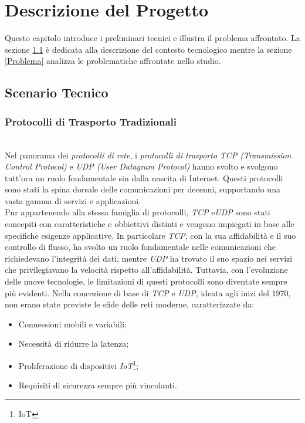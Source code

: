 \chapter{Descrizione del Progetto}
\label{cap:descrizione}

Questo capitolo introduce i preliminari tecnici e illustra il problema affrontato. La sezione \ref{Scenario} è dedicata alla descrizione del contesto tecnologico mentre la sezione \ref{Problema} analizza le problematiche affrontate nello studio. 

\section{Scenario Tecnico}
\label{Scenario}
\subsection{Protocolli di Trasporto Tradizionali}

~\\
\indent Nel panorama dei \emph{protocolli di rete}, i \emph{protocolli di trasporto} \emph{TCP (Transmission Control Protocol)}  e \emph{UDP (User Datagram Protocol)} hanno svolto e svolgono tutt'ora un ruolo fondamentale sin dalla nascita di Internet.
Questi protocolli sono stati la spina dorsale delle comunicazioni per decenni, supportando una vasta gamma di servizi e applicazioni.\\
Pur appartenendo alla stessa famiglia di protocolli, \emph{TCP} e\emph{UDP} sono stati concepiti con caratteristiche e obbiettivi distinti e vengono impiegati in base alle specifiche esigenze applicative.
In particolare \emph{TCP}, con la sua affidabilità e il suo controllo di flusso, ha svolto un ruolo fondamentale nelle comunicazioni che richiedevano l'integrità dei dati, mentre \emph{UDP} ha trovato il suo spazio nei servizi che privilegiavano la velocità rispetto all'affidabilità. 
Tuttavia, con l'evoluzione delle nuove tecnologie, le limitazioni di questi protocolli sono diventate sempre più evidenti. Nella concezione di base di \emph{TCP} e \emph{UDP}, ideata agli inizi del 1970, non erano state previste le sfide delle reti moderne, 
caratterizzate da:  
\begin{itemize}
    \item Connessioni mobili e variabili;
    
    \item Necessità di ridurre la latenza;
    
    \item Proliferazione di dispositivi \emph{IoT}\footnote{\gls{IoT}};
     
    \item Requisiti di sicurezza sempre più vincolanti.
\end{itemize}

